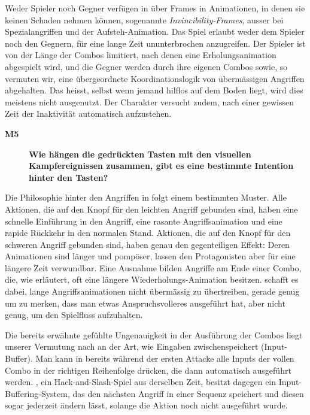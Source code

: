 \documentclass[../Main.tex]{subfiles}
\begin{document}
Weder Spieler noch Gegner verfügen in  über Frames in Animationen, in denen sie keinen Schaden nehmen können, sogenannte \textit{Invincibility-Frames}, ausser bei Spezialangriffen und der Aufsteh-Animation. Das Spiel erlaubt weder dem Spieler noch den Gegnern, für eine lange Zeit ununterbrochen anzugreifen. Der Spieler ist von der Länge der Combos limitiert, nach denen eine Erholungsanimation abgespielt wird, und die Gegner werden durch ihre eigenen Combos sowie, so vermuten wir, eine übergeordnete Koordinationslogik von übermässigen Angriffen abgehalten. Das heisst, selbst wenn jemand hilflos auf dem Boden liegt, wird dies meistens nicht ausgenutzt. Der Charakter versucht zudem, nach einer gewissen Zeit der Inaktivität automatisch aufzustehen.

\begin{description}
    \item[\textbf{M5}] \textbf{Wie hängen die gedrückten Tasten mit den visuellen Kampfereignissen zusammen, gibt es eine bestimmte Intention hinter den Tasten?}
\end{description}

Die Philosophie hinter den Angriffen in  folgt einem bestimmten Muster. Alle Aktionen, die auf den Knopf für den leichten Angriff gebunden sind, haben eine schnelle Einführung in den Angriff, eine rasante Angriffsanimation und eine rapide Rückkehr in den normalen Stand. Aktionen, die auf den Knopf für den schweren Angriff gebunden sind, haben genau den gegenteiligen Effekt: Deren Animationen sind länger und pompöser, lassen den Protagonisten aber für eine längere Zeit verwundbar. Eine Ausnahme bilden Angriffe am Ende einer Combo, die, wie erläutert, oft eine längere Wiederholungs-Animation besitzen.  schafft es dabei, lange Angriffsanimationen nicht übermässig zu übertreiben, gerade genug um zu merken, dass man etwas Anspruchsvolleres ausgeführt hat, aber nicht genug, um den Spielfluss aufzuhalten.

Die bereits erwähnte gefühlte Ungenauigkeit in der Ausführung der Combos liegt unserer Vermutung nach an der Art, wie  Eingaben zwischenspeichert (Input-Buffer). Man kann in  bereits während der ersten Attacke alle Inputs der vollen Combo in der richtigen Reihenfolge drücken, die dann automatisch ausgeführt werden. ,\autocite{capcom_devilmaycry3_2005} ein Hack-and-Slash-Spiel aus derselben Zeit, besitzt dagegen ein Input-Buffering-System, das den nächsten Angriff in einer Sequenz speichert und diesen sogar jederzeit ändern lässt, solange die Aktion noch nicht ausgeführt wurde.\autocite{dmcwiki_inputbuffering}
\end{document}
